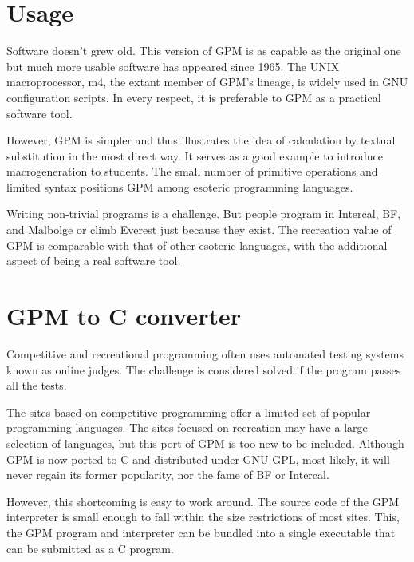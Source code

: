 \documentclass[letterpaper,10pt]{article}
\begin{document}

\section{Usage}
Software doesn't grew old. This version of GPM is as capable as the original
one but much more usable software has appeared since 1965. The UNIX
macroprocessor, m4, the extant member of GPM's lineage, is widely
used in GNU configuration scripts. In every respect, it is preferable
to GPM as a practical software tool.

However, GPM is simpler and thus illustrates the idea of calculation by
textual substitution in the most direct way. It serves as a good example
to introduce macrogeneration to students. The small number of primitive
operations and limited syntax positions GPM among esoteric programming
languages.

Writing non-trivial programs is a challenge. But people program in
Intercal, BF, and Malbolge or climb Everest just because they exist. The recreation value of
GPM is comparable with that of other esoteric languages, with the additional
aspect of being a real software tool.

\section{GPM to C converter}
Competitive and recreational programming often uses automated testing systems
known as online judges. The challenge is considered solved if the program
passes all the tests. 

The sites based on competitive programming offer a limited set of
popular programming languages. The sites focused on recreation may have a 
large selection of languages, but this port of GPM is too new to be
included. Although GPM is now ported to C and distributed under GNU GPL, most
likely, it will never regain its former popularity, nor the fame of BF or Intercal.

However, this shortcoming is easy to work around. The source code of the
GPM interpreter is small enough to fall within the size restrictions of
most sites. This, the GPM program and interpreter can be bundled into a
single executable that can be submitted as a C program.
\end{document}

